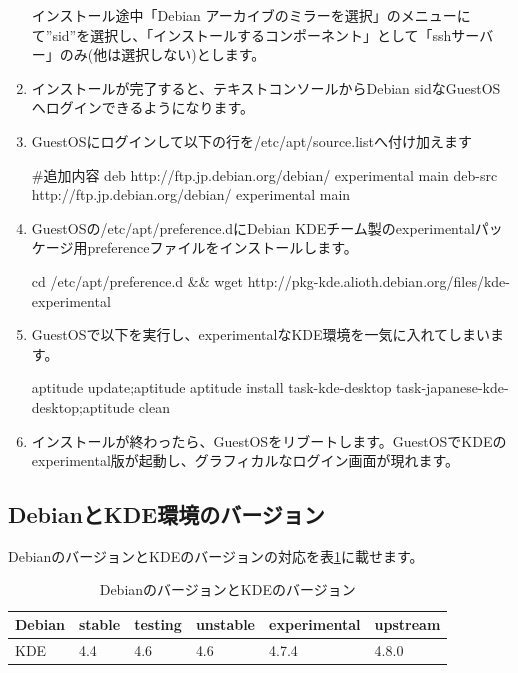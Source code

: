 \documentclass[mingoth,a4paper]{jsarticle}
\begin{document}
\begin{enumerate}
\begin{commandline}
\end{commandline}
インストール途中「Debian アーカイブのミラーを選択」のメニューにて''sid''を選択し、「インストールするコンポーネント」として「sshサーバー」のみ(他は選択しない)とします。
\item インストールが完了すると、テキストコンソールからDebian sidなGuestOSへログインできるようになります。
\item GuestOSにログインして以下の行を/etc/apt/source.listへ付け加えます
\begin{commandline}
#追加内容
deb http://ftp.jp.debian.org/debian/ experimental main
deb-src http://ftp.jp.debian.org/debian/ experimental main
\end{commandline}
\item GuestOSの/etc/apt/preference.dにDebian KDEチーム製のexperimentalパッケージ用preferenceファイルをインストールします。
\begin{commandline}
cd /etc/apt/preference.d && wget http://pkg-kde.alioth.debian.org/files/kde-experimental
\end{commandline}
\item GuestOSで以下を実行し、experimentalなKDE環境を一気に入れてしまいます。
\begin{commandline}
aptitude update;aptitude aptitude install task-kde-desktop task-japanese-kde-desktop;aptitude clean
\end{commandline}
\item インストールが終わったら、GuestOSをリブートします。GuestOSでKDEのexperimental版が起動し、グラフィカルなログイン画面が現れます。
\end{enumerate}

\subsection{DebianとKDE環境のバージョン}

DebianのバージョンとKDEのバージョンの対応を表\ref{tab:kde-ver}に載せます。

\begin{table}[ht]
\begin{center}
\begin{tabular}{|l|l|l|l|l||l|}
\hline 
Debian&stable&testing&unstable&experimental&upstream\\
\hline \hline
KDE &4.4&4.6&4.6&4.7.4&4.8.0\\
\hline
\end{tabular}
\caption{\label{tab:kde-ver}DebianのバージョンとKDEのバージョン}
\end{center}
\end{table}
\end{document}
